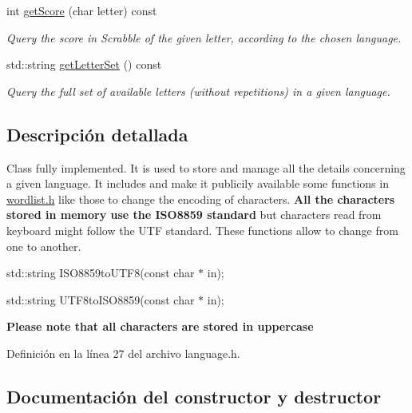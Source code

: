 \begin{DoxyCompactItemize}
int \hyperlink{classLanguage_a02f7ca8ab721b358955c50df51de6df1}{get\+Score} (char letter) const
\begin{DoxyCompactList}\small\item\em Query the score in Scrabble of the given letter, according to the chosen language. \end{DoxyCompactList}\item 
std\+::string \hyperlink{classLanguage_ad72e0fe4a285a849d217a1b9251c79f1}{get\+Letter\+Set} () const
\begin{DoxyCompactList}\small\item\em Query the full set of available letters (without repetitions) in a given language. \end{DoxyCompactList}\end{DoxyCompactItemize}


\subsection{Descripción detallada}
Class fully implemented. It is used to store and manage all the details concerning a given language. It includes and make it publicily available some functions in \hyperlink{wordlist_8h_source}{wordlist.\+h} like those to change the encoding of characters. {\bfseries All the characters stored in memory use the I\+S\+O8859 standard} but characters read from keyboard might follow the U\+TF standard. These functions allow to change from one to another. 


\begin{DoxyItemize}
\item std\+::string I\+S\+O8859to\+U\+T\+F8(const char $\ast$ in);
\item std\+::string U\+T\+F8to\+I\+S\+O8859(const char $\ast$ in);
\end{DoxyItemize}

{\bfseries Please note that all characters are stored in uppercase} 

Definición en la línea 27 del archivo language.\+h.



\subsection{Documentación del constructor y destructor}
\mbox{\label{classLanguage_ad7c92d28e44058ef4c7ea1b413a4b269}} 

